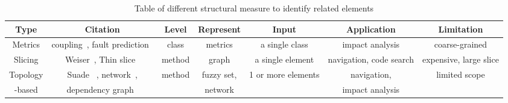 \begin{table*}[ht]

\begin{center}
\caption{Table of different structural measure to identify related elements}
\label{tab:total}
\vspace{1mm}
\scriptsize{
\begin{tabular*}{1\textwidth}{@{}c|c|c|c|c|c|c@{}} \hline
Type&Citation&Level&Represent&Input&Application&Limitation\\\hline
Metrics& coupling~\cite{Briand:structural99}, fault prediction~\cite{ Gyimothy:metrics05, Nagappan:ICSE06} &class&metrics&a single class&impact analysis&coarse-grained\\ \hline
Slicing&Weiser~\cite{Weiser:slice84}, Thin slice~\cite{Bodik:slicePLSI07}&method&graph&a single element&navigation, code search&expensive, large slice\\ \hline
Topology& Suade ~\cite{Robillard:FSE05, Devanbu:randomWalk07}, network~\cite{Zimmermann:ICSE08},&method&fuzzy set, &1 or more elements&navigation,&limited scope\\ 
-based&dependency graph~\cite{PRMiner:FSE05, Orso:impactDynamic03, Murphy:nlConcern11} &&network&& impact analysis &\\\hline

\end{tabular*}
 \label{tab:dataset}
\vspace{0.1cm}


}
 \end{center}
\end{table*}





